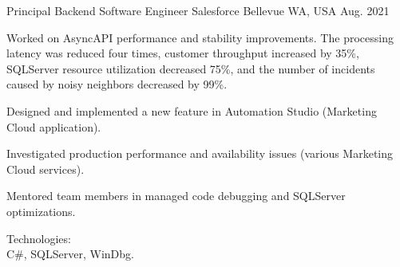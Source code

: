 
\begin{cventries}

\cventry
{Principal Backend Software Engineer} %
{Salesforce} %
{Bellevue WA, USA} %
{Aug. 2021 } %
{
  \begin{cvitems} %
    \item
    {
      Worked on AsyncAPI performance and stability improvements.
      The processing latency was reduced four times, customer throughput increased by 35\%, SQLServer resource utilization decreased 75\%, and the number of incidents caused by noisy neighbors decreased by 99\%.
    }
    \item
    {
      Designed and implemented a new feature in Automation Studio (Marketing Cloud application).
    }
    \item
    {
      Investigated production performance and availability issues (various Marketing Cloud services).
    }
    \item
    {
      Mentored team members in managed code debugging and SQLServer optimizations.
    }
    \item
    {
      Technologies:\\
      {C\#}, SQLServer, WinDbg.
    }
  \end{cvitems}
}



\end{cventries}
